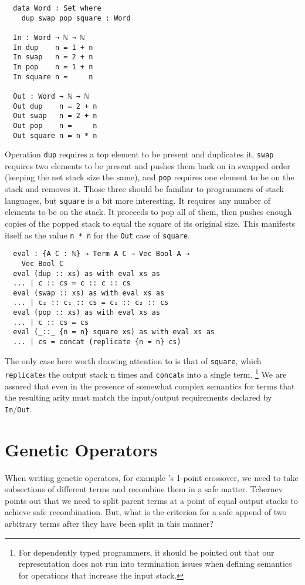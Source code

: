 \documentclass{acm_proc_article-sp}
\begin{document}
\begin{verbatim}
  data Word : Set where
    dup swap pop square : Word

  In : Word → ℕ → ℕ
  In dup    n = 1 + n
  In swap   n = 2 + n
  In pop    n = 1 + n
  In square n =     n

  Out : Word → ℕ → ℕ
  Out dup    n = 2 + n
  Out swap   n = 2 + n
  Out pop    n =     n
  Out square n = n * n
\end{verbatim}

Operation \texttt{dup} requires a top element to be present and
duplicates it, \texttt{swap} requires two elements to be present and
pushes them back on in swapped order (keeping the net stack size the
same), and \texttt{pop} requires one element to be on the stack and
removes it. Those three should be familiar to programmers of stack
languages, but \texttt{square} is a bit more interesting. It requires
any number of elements to be on the stack. It proceeds to pop all of
them, then pushes enough copies of the popped stack to equal the
square of its original size. This manifests itself as the value
\texttt{n * n} for the \texttt{Out} case of \texttt{square}.

\begin{verbatim}
  eval : {A C : ℕ} → Term A C → Vec Bool A →
    Vec Bool C
  eval (dup :: xs) as with eval xs as
  ... | c :: cs = c :: c :: cs
  eval (swap :: xs) as with eval xs as
  ... | c₂ :: c₁ :: cs = c₁ :: c₂ :: cs
  eval (pop :: xs) as with eval xs as
  ... | c :: cs = cs
  eval (_::_ {n = n} square xs) as with eval xs as
  ... | cs = concat (replicate {n = n} cs)
\end{verbatim}

The only case here worth drawing attention to is that of
\texttt{square}, which \texttt{replicate}s the output stack n times
and \texttt{concat}s into a single term.
\footnote{For dependently typed programmers, it should be pointed out
  that our representation does not run into termination issues when
  defining semantics for operations that increase the input stack. }
We are assured that even in the presence of somewhat complex semantics
for terms that the resulting arity must match the input/output
requirements declared by \texttt{In}/\texttt{Out}.

\section{Genetic Operators}

When writing genetic operators, for example
\cite{tchernev:forthcross}'s 1-point crossover, we need to take
subsections of different terms and recombine them in a safe
matter. Tchernev points out that we need to split parent terms at a
point of equal output stacks to achieve safe recombination. But,
what is the criterion for a safe append of two arbitrary terms after
they have been split in this manner?
\end{document}
